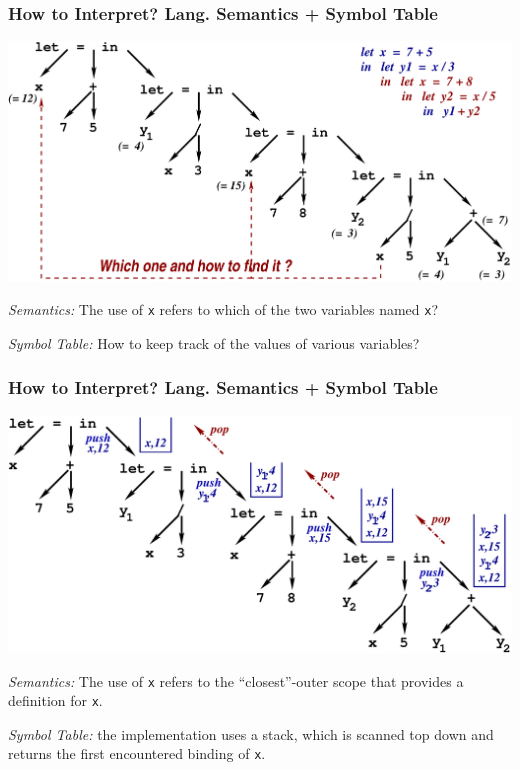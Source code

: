 \documentclass{beamer}
\begin{document}
\begin{frame}[fragile,t]
   \frametitle{How to Interpret? Lang. Semantics + Symbol Table}

\includegraphics[width=67ex]{Figures/ExpIntNoStack}

\bigskip

{\em Semantics:} The use of {\tt x} refers to which of the two variables named {\tt x}?

\bigskip

{\em Symbol Table:} How to keep track of the values of various variables?


\end{frame}


\begin{frame}[fragile,t]
   \frametitle{How to Interpret? Lang. Semantics + Symbol Table}

\includegraphics[width=65ex]{Figures/ExpIntStack}

\bigskip

{\em Semantics:} The use of {\tt x} refers to the ``closest''-outer scope that provides a definition for {\tt x}.

\bigskip

{\em Symbol Table:} the implementation uses a stack, which is scanned top down and returns the first encountered binding of {\tt x}.


\end{frame}
\end{document}
